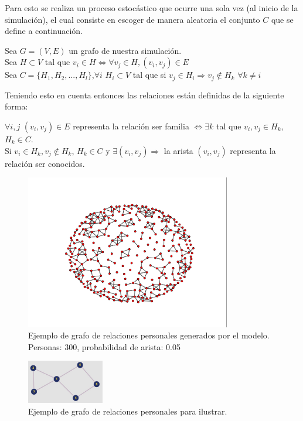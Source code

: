 Para esto se realiza un proceso estocástico que ocurre una sola vez (al inicio de la simulación), el cual consiste 
en escoger de manera aleatoria el conjunto $C$ que se define a continuación.
\begin{center}
    Sea $G = (V,E)$ un grafo de nuestra simulación.\\
    Sea $H \subset V$ tal que $v_{i} \in H \Leftrightarrow \forall v_{j} \in H, (v_{i},v_{j}) \in E$\\
    Sea $C = \lbrace H_{1}, H_{2}, ..., H_{l} \rbrace$,$\forall i$ $H_{i} \subset V$ tal que si $v_{j} \in H_{i} \Rightarrow v_{j} \notin H_{k}$ $\forall k \neq i$\\
\end{center}

Teniendo esto en cuenta entonces las relaciones están definidas de la siguiente forma:
\begin{center}
    $\forall i,j$ $(v_{i}, v_{j}) \in E$ representa la relación ser familia  $\Leftrightarrow \exists k$ tal que $v_{i}, v_{j} \in H_{k}$, $H_{k} \in C$.\\
    Si $v_{i} \in H_{k}, v_{j} \notin H_{k}$, $H_{k} \in C$ y $\exists (v_{i}, v_{j}) \Rightarrow$ la arista $(v_{i}, v_{j})$  representa
    la relación ser conocidos.
\end{center}


\begin{figure}[htb]
    \centering
    \includegraphics[width=0.8\textwidth]{Graphics/Grafo_Pers.png}
    \caption{Ejemplo de grafo de relaciones personales generados por el modelo. Personas: 300, probabilidad de arista: 0.05}
\end{figure}

\begin{figure}
    \centering
    \includegraphics[width=0.3\textwidth]{Graphics/Grafo_Familias.jpeg}
    \caption{Ejemplo de grafo de relaciones personales para ilustrar.}
\end{figure}

